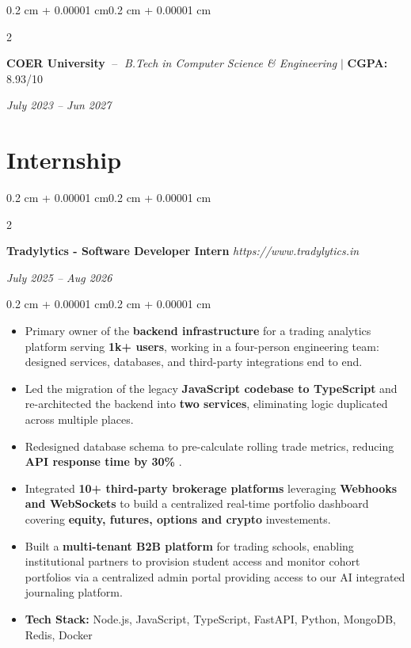 \documentclass[10pt, letterpaper]{article}
\newenvironment{highlights}{
    \begin{itemize}[
        topsep=0.06 cm,
        parsep=0.06 cm,
        partopsep=0pt,
        itemsep=0pt,
        leftmargin=0.4 cm + 10pt
    ]
}{
    \end{itemize}
}
\newenvironment{onecolentry}{
    \begin{adjustwidth}{0.2 cm + 0.00001 cm}{0.2 cm + 0.00001 cm}
}{
    \end{adjustwidth}
}
\newenvironment{twocolentry}[2][]{
    \onecolentry
    \def\secondColumn{#2}
    \setcolumnwidth{\fill, 4.5 cm}
    \begin{paracol}{2}
}{
    \switchcolumn \raggedleft \secondColumn
    \end{paracol}
    \endonecolentry
}
\begin{document}
    \begin{twocolentry}{\textit{July 2023 -- Jun 2027}}
        \textbf{COER University}
        $\;$--$\;$ \textit{B.Tech in Computer Science \& Engineering}
        \quad $|$ \quad \textbf{CGPA:} 8.93/10
        \end{twocolentry}
        
\vspace{0.10 cm}
    


\section{Internship}
    \begin{twocolentry}{   
        \textit{July 2025 -- Aug 2026}}
            \textbf{Tradylytics - Software Developer Intern}
            \quad
            \textit{https://www.tradylytics.in}
    \end{twocolentry}   
    \vspace{0.10 cm}
    \begin{onecolentry}
        \begin{highlights}
            \item Primary owner of the \textbf{backend infrastructure} for a trading analytics platform serving \textbf{1k+ users}, working in a four-person 
                engineering team: designed services, databases, and third-party integrations end to end.
            \item Led the migration of the legacy \textbf{JavaScript codebase to TypeScript} and re-architected the backend into \textbf{two services}, 
                eliminating logic duplicated across multiple places.
            \item Redesigned database schema to pre-calculate rolling trade metrics, reducing \textbf{API response time by 30\% }.
            \item Integrated \textbf{10+ third-party brokerage platforms} leveraging \textbf{Webhooks and WebSockets} to build a centralized real-time portfolio 
                dashboard covering \textbf{equity, futures, options and crypto} investements.
            \item Built a \textbf{multi-tenant B2B platform} for trading schools, enabling institutional partners to provision student access and monitor cohort 
                portfolios via a centralized admin portal providing access to our AI integrated journaling platform.
            \item \textbf{Tech Stack:} Node.js, JavaScript, TypeScript, FastAPI, Python, MongoDB, Redis, Docker
        \end{highlights}
    \end{onecolentry}
\vspace{0.1 cm}
    
\end{document}
